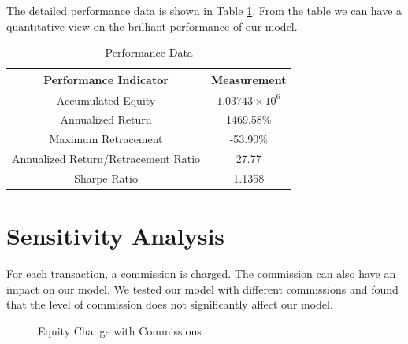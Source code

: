 \documentclass[12pt,a4paper]{article}
\begin{document}
\begin{spacing}{1.2}
The detailed performance data is shown in Table \ref{table:performance}. From the table we can have a quantitative view on the brilliant performance of our model.

\begin{table}[H]
	\renewcommand{\arraystretch}{1.5}
	\caption{Performance Data}
	\label{table:performance}
	\begin{center}
		{\footnotesize
			\begin{tabular}{c c }
				\toprule
				Performance Indicator & Measurement\\
				\midrule
				Accumulated Equity & $1.03743 \times 10^6$ \\
				Annualized Return & 1469.58\% \\
				Maximum Retracement & -53.90\% \\
				Annualized Return/Retracement Ratio & 27.77 \\
				Sharpe Ratio & 1.1358 \\
				\bottomrule
		\end{tabular}}
	\end{center}	
\end{table}



\section{Sensitivity Analysis}
\label{SensitivityAnalysis}

For each transaction, a commission is charged. The commission can also have an impact on our model. We tested our model with different commissions and found that the level of commission does not significantly affect our model.

 \begin{figure}[H]
	\caption{Equity Change with Commissions}
	\label{figure:sensitive_test}
\end{figure}


\end{spacing}
\end{document}
